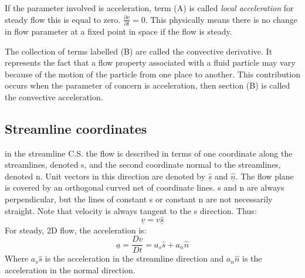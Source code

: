 If the parameter involved is acceleration, term (A) is called \emph{local acceleration} for steady flow this is equal to zero. \( \frac{\partial v}{\partial t} = 0 \). This physically means there is no change in flow parameter at a fixed point in space if the flow is steady.

The collection of terms labelled (B) are called the convective derivative. It represents the fact that a flow property associated with a fluid particle may vary because of the motion of the particle from one place to another. This contribution occurs when the parameter of concern is acceleration, then section (B) is called the convective acceleration.
\subsection{Streamline coordinates}
in the streamline C.S. the flow is described in terms of one coordinate along the streamlines, denoted s, and the second coordinate normal to the streamlines, denoted n. Unit vectors in this direction are denoted by \( \underline{\hat{s}} \) and \( \underline{\hat{n}} \). The flow plane is covered by an orthogonal curved net of coordinate lines. s and n are always perpendicular, but the lines of constant s or constant n are not necessarily straight. Note that velocity is always tangent to the s direction. Thus:
\begin{equation}
  \underline{v} = v\underline{\hat{s}}
\end{equation}
For steady, 2D flow, the acceleration is:
\begin{equation}
  \underline{a} = \frac{Dv}{Dt} = a_s \hat{s} + a_n \hat{n}
\end{equation}
Where \( a_s \hat{s} \) is the acceleration in the streamline direction and \( a_n \hat{n} \) is the acceleration in the normal direction.

